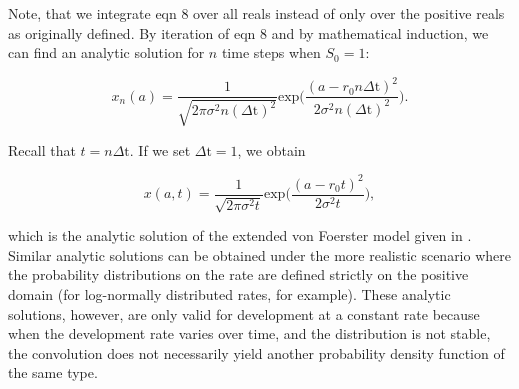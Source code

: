 \documentclass[12pt]{article}
\begin{document}
Note, that we integrate eqn 8 over all reals instead of only over the positive reals as originally defined. By iteration of eqn 8 and by mathematical induction, we can find an analytic solution for $n$ time steps when $S_0 = 1$:

\begin{equation*}
x_n(a) = \frac{1}{\sqrt{2\pi \sigma^2 n(\Delta\text{t})^2}}\text{exp}\bigg(\frac{(a - r_0n\Delta\text{t})^2}{2 \sigma^2 n(\Delta\text{t})^2}\bigg). \tag{eqn A1.3}
\end{equation*}

Recall that $t = n\Delta\text{t}$. If we set $\Delta\text{t} = 1$, we obtain

\begin{equation*}
x(a,t) = \frac{1}{\sqrt{2\pi \sigma^2 t}}\text{exp}\bigg(\frac{(a - r_0t)^2}{2 \sigma^2 t}\bigg), \tag{eqn A1.4}
\end{equation*}

which is the analytic solution of the extended von Foerster model given in \citet{Gilbert2004}. Similar analytic solutions can be obtained under the more realistic scenario where the probability distributions on the rate are defined strictly on the positive domain (for log-normally distributed rates, for example). These analytic solutions, however, are only valid for development at a constant rate because when the development rate varies over time, and the distribution is not stable, the convolution does not necessarily yield another probability density function of the same type.



\end{document}
